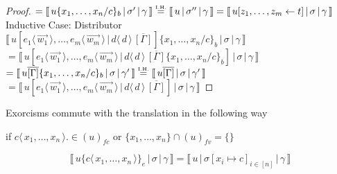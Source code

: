 \documentclass[a4paper,UKenglish,cleveref, autoref]{lipics-v2019}
\newcommand{\fv}[1]{(#1)_{fv}}
\newcommand{\fc}[1]{(#1)_{fc}}
\newcommand{\set}[1]{ \{ #1 \} }
\newcommand{\fake}[3]{#1 \langle \, #2 \, \rangle . #3}
\newcommand{\share}[3]{#1 [#2 \leftarrow #3]}
\newcommand{\dist}[5]{#1 [ #2 \, \vert \, \fakedist{#4}{#5} \, #3 ]}
\newcommand{\fakedist}[2]{#1 \langle \, #2 \, \rangle}
\newcommand{\psub}[3]{#1 \{ #2 / #3 \}_{b}}
\newcommand{\exor}[3]{#1 \{ \fakedist{#2}{#3} \}_{e}}
\newcommand{\readbackwmap}[3]{\llbracket \, #1 \, \vert \, #2 \, \vert \, #3  \, \rrbracket }
\newcommand{\IH}{\stackrel{\hbox{\tiny I.H.}}{\hbox{=}}}
\begin{document}
\begin{proof}
$= \readbackwmap{u \psub{}{x_{1}, \dots, x_{n}}{c}}{\sigma'}{\gamma} \IH \readbackwmap{u}{\sigma''}{\gamma} = \readbackwmap{\share{u}{z_{1}, \dots, z_{m}}{t}}{\sigma}{\gamma}$
\newline
\newline
Inductive Case: Distributor
\newline
$\readbackwmap{\dist{u}{\fakedist{e_{1}}{\vec{w_{1}}}, \dots, \fakedist{e_{m}}{\vec{w_{m}}}}{\overline{[\Gamma]}}{d}{d}  \psub{}{x_{1}, \dots, x_{n}}{c}}{\sigma}{\gamma}$
\newline
$= \readbackwmap{\dist{u}{\fakedist{e_{1}}{\vec{w_{1}}}, \dots, \fakedist{e_{m}}{\vec{w_{m}}}}{\overline{[\Gamma]} \psub{}{x_{1}, \dots, x_{n}}{c}}{d}{d} }{\sigma}{\gamma}$
\newline
$= \readbackwmap{u \overline{[\Gamma]}\psub{}{x_{1}, \dots, x_{n}}{c}}{\sigma}{\gamma'} \IH \readbackwmap{u \overline{[\Gamma]}}{\sigma}{\gamma'}$
\newline
$= \readbackwmap{\dist{u}{\fakedist{e_{1}}{\vec{w_{1}}}, \dots, \fakedist{e_{m}}{\vec{w_{m}}}}{\overline{[\Gamma]}}{d}{d}}{\sigma}{\gamma}$
\end{proof}

Exorcisms commute with the translation in the following way

if $\fake{c}{x_{1}, \dots, x_{n}} \in \fc{u}$ or $\set{x_{1}, \dots, x_{n}} \cap \fv{u} = \set{}$

$$\readbackwmap{u \exor{}{c}{x_{1}, \dots, x_{n}}}{\sigma}{\gamma} = \readbackwmap{u}{\sigma[x_{i} \mapsto c]_{i \in [n]}}{\gamma}$$
\end{document}
